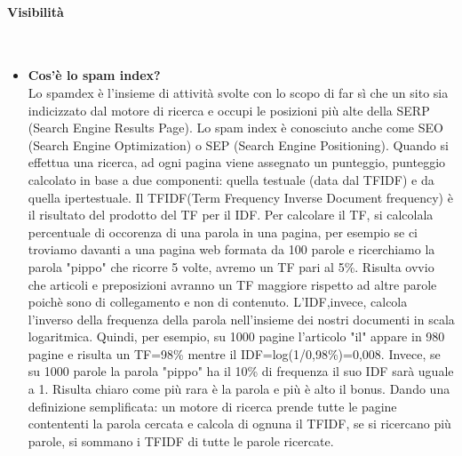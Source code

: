\documentclass[10pt,                    %
               a4paper,                 %
               twoside,                 %
               openright,               %
               english,                 
               italian,                 
]{article}
\begin{document}
\paragraph{Visibilità} \mbox{}\\
\begin{itemize}
\item \textbf{Cos'è lo spam index?} \\
Lo spamdex è l'insieme di attività svolte con lo scopo di far sì che un
sito sia indicizzato dal motore di ricerca e occupi le posizioni più alte 
della SERP (Search Engine Results Page).
Lo spam index è conosciuto anche come SEO (Search Engine Optimization) o SEP
(Search Engine Positioning). Quando si effettua una ricerca, ad ogni pagina
viene assegnato un punteggio, punteggio calcolato in base a due componenti: 
quella testuale (data dal TFIDF) e da quella ipertestuale. Il TFIDF(Term 
Frequency Inverse Document frequency) è il risultato del prodotto del TF per 
il IDF. Per calcolare il TF, si calcolala percentuale di occorenza di una 
parola in una pagina, per esempio se ci troviamo davanti a una pagina web 
formata da 100 parole e ricerchiamo la parola "pippo" che ricorre 5 volte, 
avremo un TF pari al 5\%. Risulta ovvio che articoli e preposizioni avranno 
un TF maggiore rispetto ad altre parole poichè sono di collegamento e non di 
contenuto.
L'IDF,invece, calcola l'inverso della frequenza della parola nell'insieme dei
nostri documenti in scala logaritmica. Quindi, per esempio, su 1000 pagine
l'articolo "il" appare in 980 pagine e risulta un TF=98\% mentre il
IDF=log(1/0,98\%)=0,008. Invece, se su 1000 parole la parola "pippo" ha il
10\% di frequenza il suo IDF sarà uguale a 1. Risulta chiaro come più rara è
la parola e più è alto il bonus.
Dando una definizione semplificata: un motore di ricerca prende tutte le 
pagine contententi la parola cercata e calcola di ognuna il TFIDF, se si 
ricercano più parole, si sommano i TFIDF di tutte le parole ricercate. \\


\end{itemize}
\end{document}
